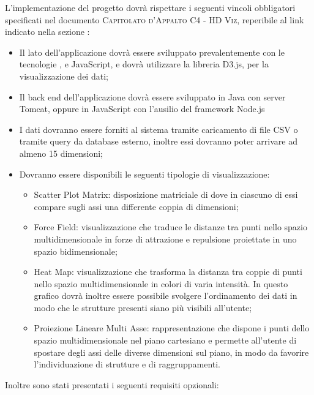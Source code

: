 \documentclass[../analisi-dei-requisiti.tex]{subfiles}
\begin{document}
L'implementazione del progetto dovrà rispettare i seguenti vincoli obbligatori specificati nel documento
\textsc{Capitolato d'Appalto C4 - HD Viz}, reperibile al link indicato nella sezione :
\begin{itemize}
    \item Il lato  dell'applicazione dovrà essere sviluppato prevalentemente con le tecnologie
    ,  e JavaScript, e dovrà utilizzare la libreria D3.js, per la
    visualizzazione dei dati;
    \item Il back end dell'applicazione dovrà essere sviluppato in Java con server Tomcat,
    oppure in JavaScript con l'ausilio del framework Node.js
    \item I dati dovranno essere forniti al sistema tramite caricamento di file CSV o tramite query da database
    esterno, inoltre essi dovranno poter arrivare ad almeno 15 dimensioni;
    \item Dovranno essere disponibili le seguenti tipologie di visualizzazione:
    \begin{itemize}
        \item Scatter Plot Matrix: disposizione matriciale di  dove in ciascuno di essi compare
        sugli assi una differente coppia di dimensioni;
        \item Force Field: visualizzazione che traduce le distanze tra punti nello spazio multidimensionale in forze
        di attrazione e repulsione proiettate in uno spazio bidimensionale;
        \item Heat Map: visualizzazione che trasforma la distanza tra coppie di punti nello spazio multidimensionale in
        colori di varia intensità. In questo grafico dovrà inoltre essere possibile svolgere l'ordinamento dei dati in
        modo che le strutture presenti siano più visibili all'utente;
        \item Proiezione Lineare Multi Asse: rappresentazione che dispone i punti dello spazio multidimensionale nel
        piano cartesiano e permette all'utente di spostare degli assi delle diverse dimensioni sul piano, in modo da
        favorire l'individuazione di strutture e di raggruppamenti.
    \end{itemize}
\end{itemize}
Inoltre sono stati presentati i seguenti requisiti opzionali:
\end{document}
